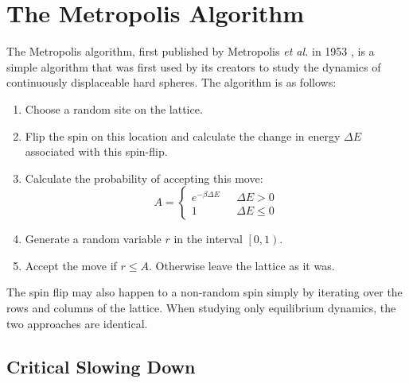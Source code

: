 \documentclass[11pt, a4paper]{report} %
\begin{document}
\section{The Metropolis Algorithm}
The Metropolis algorithm, first published by Metropolis \textit{et al.} in 1953 \cite{metropolis:1953}, is a simple algorithm that was first used by its creators to study the dynamics of continuously displaceable hard spheres.
The algorithm is as follows\cite{binney:1992}:
\begin{enumerate}
	\item Choose a random site on the lattice.
	\item Flip the spin on this location and calculate the change in energy \(\Delta E\) associated with this spin-flip.
	\item Calculate the probability of accepting this move:
	\begin{equation}
		A =
		\begin{cases}
			e^{-\beta \Delta E}\ \ \ &\Delta E > 0 \\
			1 \ \ \ &\Delta E \leq 0
		\end{cases}
	\end{equation}
	\item Generate a random variable \(r\) in the interval \(\left[0, 1\right)\).
	\item Accept the move if \(r \leq A\). Otherwise leave the lattice as it was.
\end{enumerate}
The spin flip may also happen to a non-random spin simply by iterating over the rows and columns of the lattice. When studying only equilibrium dynamics, the two approaches are identical.\cite{landau:2015}




\subsection{Critical Slowing Down} \label{sec:critical_slowing_down}
\end{document}
